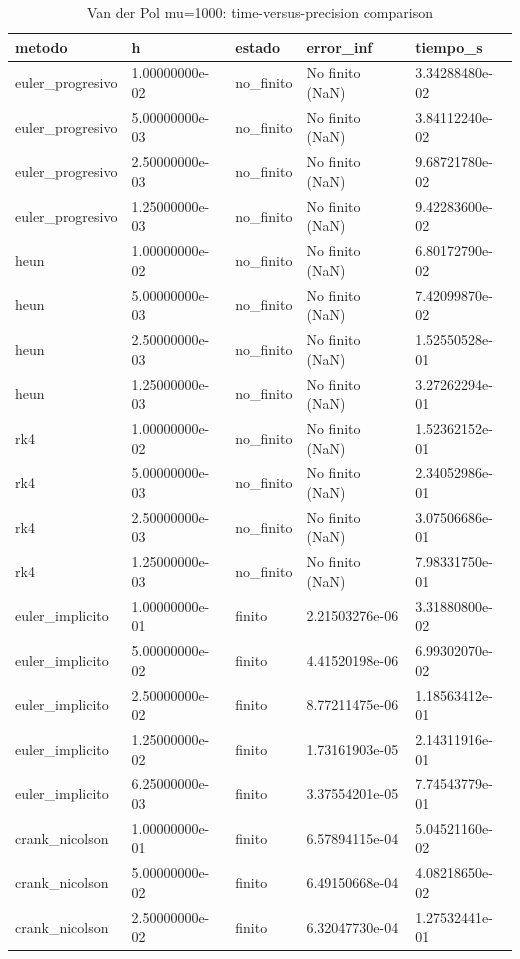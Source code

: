 \begin{table}[htbp]
\centering
\caption{Van der Pol mu=1000: time-versus-precision comparison}
\label{tab:van-der-pol-mu-1000}
\begin{tabular}{lllll}
\hline
metodo & h & estado & error\_inf & tiempo\_s \\
\hline
euler\_progresivo & 1.00000000e-02 & no\_finito & No finito (NaN) & 3.34288480e-02 \\
euler\_progresivo & 5.00000000e-03 & no\_finito & No finito (NaN) & 3.84112240e-02 \\
euler\_progresivo & 2.50000000e-03 & no\_finito & No finito (NaN) & 9.68721780e-02 \\
euler\_progresivo & 1.25000000e-03 & no\_finito & No finito (NaN) & 9.42283600e-02 \\
heun & 1.00000000e-02 & no\_finito & No finito (NaN) & 6.80172790e-02 \\
heun & 5.00000000e-03 & no\_finito & No finito (NaN) & 7.42099870e-02 \\
heun & 2.50000000e-03 & no\_finito & No finito (NaN) & 1.52550528e-01 \\
heun & 1.25000000e-03 & no\_finito & No finito (NaN) & 3.27262294e-01 \\
rk4 & 1.00000000e-02 & no\_finito & No finito (NaN) & 1.52362152e-01 \\
rk4 & 5.00000000e-03 & no\_finito & No finito (NaN) & 2.34052986e-01 \\
rk4 & 2.50000000e-03 & no\_finito & No finito (NaN) & 3.07506686e-01 \\
rk4 & 1.25000000e-03 & no\_finito & No finito (NaN) & 7.98331750e-01 \\
euler\_implicito & 1.00000000e-01 & finito & 2.21503276e-06 & 3.31880800e-02 \\
euler\_implicito & 5.00000000e-02 & finito & 4.41520198e-06 & 6.99302070e-02 \\
euler\_implicito & 2.50000000e-02 & finito & 8.77211475e-06 & 1.18563412e-01 \\
euler\_implicito & 1.25000000e-02 & finito & 1.73161903e-05 & 2.14311916e-01 \\
euler\_implicito & 6.25000000e-03 & finito & 3.37554201e-05 & 7.74543779e-01 \\
crank\_nicolson & 1.00000000e-01 & finito & 6.57894115e-04 & 5.04521160e-02 \\
crank\_nicolson & 5.00000000e-02 & finito & 6.49150668e-04 & 4.08218650e-02 \\
crank\_nicolson & 2.50000000e-02 & finito & 6.32047730e-04 & 1.27532441e-01 \\

\end{tabular}
\end{table}
